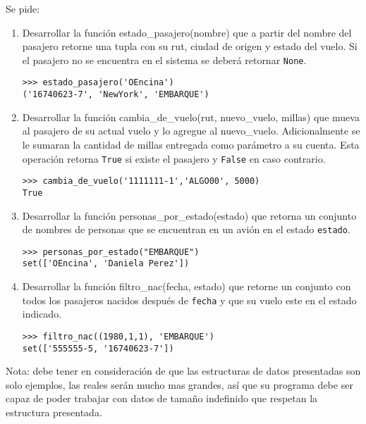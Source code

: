 Se pide:
\begin{enumerate}
\item Desarrollar la función estado\_pasajero(nombre) que a partir del nombre del pasajero retorne una tupla con su rut, ciudad de origen y estado del vuelo. Si el pasajero no se encuentra en el sistema se deberá retornar \texttt{None}.

\begin{lstlisting}[style=consola]
>>> estado_pasajero('OEncina')
('16740623-7', 'NewYork', 'EMBARQUE')
\end{lstlisting}

\item Desarrollar la función cambia\_de\_vuelo(rut, nuevo\_vuelo, millas) que mueva al pasajero de su actual vuelo y lo agregue al nuevo\_vuelo. Adicionalmente se le sumaran la cantidad de millas entregada como parámetro a su cuenta. Esta operación retorna \texttt{True} si existe el pasajero y \texttt{False} en caso contrario.

\begin{lstlisting}[style=consola]
>>> cambia_de_vuelo('1111111-1','ALGO00', 5000)
True
\end{lstlisting}

\item Desarrollar la función personas\_por\_estado(estado) que retorna un conjunto de nombres de personas que se encuentran en un avión en el estado \texttt{estado}.

\begin{lstlisting}[style=consola]
>>> personas_por_estado("EMBARQUE")
set(['OEncina', 'Daniela Perez'])
\end{lstlisting}

\item Desarrollar la función filtro\_nac(fecha, estado) que retorne un conjunto con todos los pasajeros nacidos después de \texttt{fecha} y que su vuelo este en el estado indicado.

\begin{lstlisting}[style=consola]
>>> filtro_nac((1980,1,1), 'EMBARQUE')
set(['555555-5, '16740623-7'])
\end{lstlisting}

\end{enumerate}

Nota: debe tener en consideración de que las estructuras de datos presentadas son solo ejemplos, las reales serán mucho mas grandes, así que su programa debe ser capaz de poder trabajar con datos de tamaño indefinido que respetan la estructura presentada.
